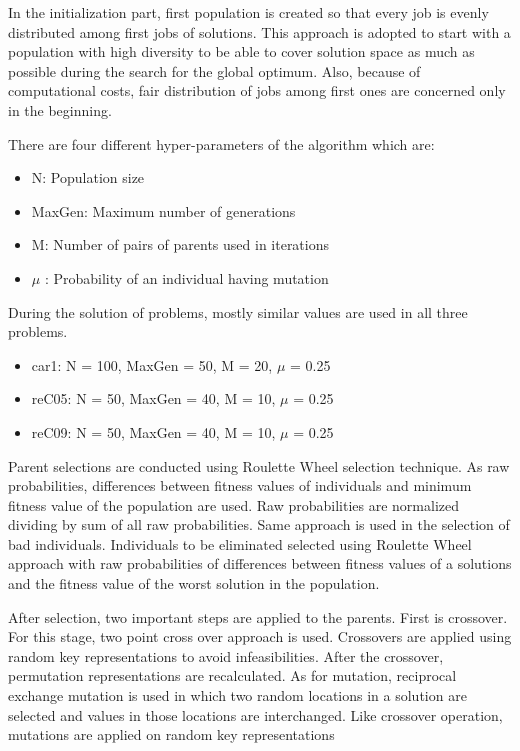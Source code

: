 \documentclass[11pt]{article}
\begin{document}
In the initialization part, first population is created so that every job is evenly distributed among first jobs of solutions. This approach is adopted to start with a population with high diversity to be able to cover solution space as much as possible during the search for the global optimum. Also, because of computational costs, fair distribution of jobs among first ones are concerned only in the beginning.

\pagebreak
There are four different hyper-parameters of the algorithm which are:

\begin{itemize}
  \item N: Population size
  \item MaxGen: Maximum number of generations
  \item M: Number of pairs of parents used in iterations
  \item $\mu$ : Probability of an individual having mutation 
\end{itemize}

During the solution of problems, mostly similar values are used in all three problems.

\begin{itemize}
  \item car1: N = 100, MaxGen = 50, M = 20, $\mu$ = 0.25
  \item reC05: N = 50, MaxGen = 40, M = 10, $\mu$ = 0.25 
  \item reC09: N = 50, MaxGen = 40, M = 10, $\mu$ = 0.25
\end{itemize}

Parent selections are conducted using Roulette Wheel selection technique. As raw probabilities, differences between fitness values of individuals and minimum fitness value of the population are used. Raw probabilities are normalized dividing by sum of all raw probabilities. Same approach is used in the selection of bad individuals. Individuals to be eliminated selected using Roulette Wheel approach with raw probabilities of differences between fitness values of a solutions and the fitness value of the worst solution in the population.

After selection, two important steps are applied to the parents. First is crossover. For this stage, two point cross over approach is used. Crossovers are applied using random key representations to avoid infeasibilities. After the crossover, permutation representations are recalculated. As for mutation, reciprocal exchange mutation is used in which two random locations in a solution are selected and values in those locations are interchanged. Like crossover operation, mutations are applied on random key representations
\end{document}
